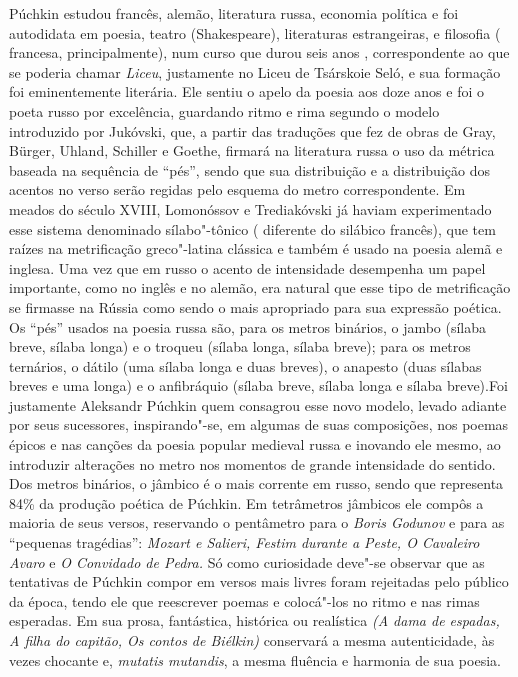Púchkin estudou francês, alemão, literatura russa, economia política e
foi autodidata em poesia, teatro (Shakespeare), literaturas
estrangeiras, e filosofia ( francesa, principalmente), num curso que
durou seis anos , correspondente ao que se poderia chamar \emph{Liceu},
justamente no Liceu de Tsárskoie Seló, e sua formação foi eminentemente
literária. Ele sentiu o apelo da poesia aos doze anos e foi o poeta
russo por excelência, guardando ritmo e rima segundo o modelo
introduzido por Jukóvski, que, a partir das traduções que fez de obras
de Gray, Bürger, Uhland, Schiller e Goethe, firmará na literatura russa
o uso da métrica baseada na sequência de ``pés'', sendo que sua
distribuição e a distribuição dos acentos no verso serão regidas pelo
esquema do metro correspondente. Em meados do século XVIII, Lomonóssov e
Trediakóvski já haviam experimentado esse sistema denominado
sílabo"-tônico ( diferente do silábico francês), que tem raízes na
metrificação greco"-latina clássica e também é usado na poesia alemã e
inglesa. Uma vez que em russo o acento de intensidade desempenha um
papel importante, como no inglês e no alemão, era natural que esse tipo
de metrificação se firmasse na Rússia como sendo o mais apropriado para
sua expressão poética. Os ``pés'' usados na poesia russa são, para os
metros binários, o jambo (sílaba breve, sílaba longa) e o troqueu
(sílaba longa, sílaba breve); para os metros ternários, o dátilo (uma
sílaba longa e duas breves), o anapesto (duas sílabas breves e uma
longa) e o anfibráquio (sílaba breve, sílaba longa e sílaba breve).Foi
justamente Aleksandr Púchkin quem consagrou esse novo modelo, levado
adiante por seus sucessores, inspirando"-se, em algumas de suas
composições, nos poemas épicos e nas canções da poesia popular medieval
russa e inovando ele mesmo, ao introduzir alterações no metro nos
momentos de grande intensidade do sentido. Dos metros binários, o
jâmbico é o mais corrente em russo, sendo que representa 84\% da
produção poética de Púchkin. Em tetrâmetros jâmbicos ele compôs a
maioria de seus versos, reservando o pentâmetro para o \emph{Boris
Godunov} e para as ``pequenas tragédias'': \emph{Mozart e Salieri,
Festim durante a Peste, O Cavaleiro Avaro} e \emph{O Convidado de
Pedra.} Só como curiosidade deve"-se observar que as tentativas de
Púchkin compor em versos mais livres foram rejeitadas pelo público da
época, tendo ele que reescrever poemas e colocá"-los no ritmo e nas rimas
esperadas. Em sua prosa, fantástica, histórica ou realística \emph{(A
dama de espadas, A filha do capitão, Os contos de Biélkin)} conservará a
mesma autenticidade, às vezes chocante e, \emph{mutatis mutandis}, a
mesma fluência e harmonia de sua poesia.

